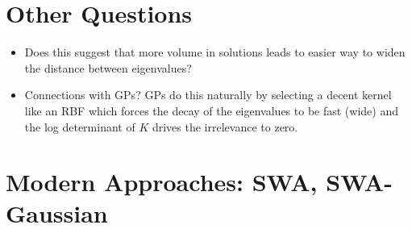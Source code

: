 \documentclass{article}
\begin{document}
\section{Other Questions}
\begin{itemize}
	\item Does this suggest that more volume in solutions leads to easier way to widen the distance between eigenvalues?
	\item Connections with GPs?
	\subitem GPs do this naturally by selecting a decent kernel like an RBF which forces the decay of the eigenvalues to be fast (wide) and the log determinant of $K$ drives the irrelevance to zero.
\end{itemize}








\section{Modern Approaches: SWA, SWA-Gaussian}
\end{document}

